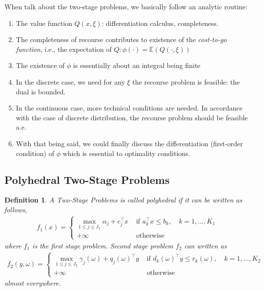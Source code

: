 \documentclass{beamerswitch}
\newcommand{\ex}{\mathbb E}
\newtheorem{defn}[thm]{Definition}
\begin{document}
When talk about the two-stage problems, we basically follow an analytic routine:

\begin{enumerate}
    \item The value function \(Q(x, \xi)\): differentiation calculus, completeness.
    \item The completeness of recourse contributes to existence of the \emph{cost-to-go function}, i.e., the expectation of \(Q: \phi(\cdot) = \ex(Q(\cdot, \xi))\)
    \item The existence of \(\phi\) is essentially about an integral being finite
    \item In the discrete case, we need for any \(\xi\) the recourse problem is feasible: the dual is bounded.
    \item In the continuous case, more technical conditions are needed. In accordance with the case of discrete distribution, the recourse problem should be feasible a.e.
    \item With that being said, we could finally discuss the differentiation (first-order condition) of \(\phi\) which is essential to optimality conditions.
\end{enumerate}


\subsection{Polyhedral Two-Stage Problems}
\begin{defn} A Two-Stage Problems is called polyhedral if it can be written as follows,
    \begin{align*}
        f_{1}(x)= \begin{cases}\max _{1 \leq j \leq J_{1}} \alpha_{j}+c_{j}^{\top} x & \text { if } a_{k}^{\top} x \leq b_{k}, \quad k=1, \ldots, K_{1} \\ +\infty & \text { otherwise }\end{cases}
    \end{align*}
    where \(f_1\) is the first stage problem. Second stage problem \(f_2\) can written as
    \begin{align*}
        f_{2}(y, \omega)= \begin{cases}\max _{1 \leq j \leq J_{2}} \gamma_{j}(\omega)+q_{j}(\omega)^{\top} y & \text { if } d_{k}(\omega)^{\top} y \leq r_{k}(\omega), \quad k=1, \ldots, K_{2} \\ +\infty & \text { otherwise }\end{cases}
    \end{align*}
    almost everywhere.
\end{defn}
\end{document}
